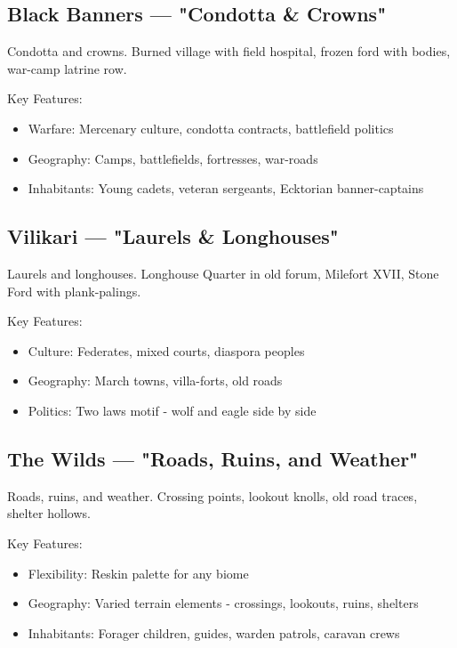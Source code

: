 \subsection{Black Banners — "Condotta \& Crowns"}
\label{sec:blackbanners}

Condotta and crowns. Burned village with field hospital, frozen ford with bodies, war-camp latrine row.

Key Features:
\begin{itemize}
    \item Warfare: Mercenary culture, condotta contracts, battlefield politics
    \item Geography: Camps, battlefields, fortresses, war-roads
    \item Inhabitants: Young cadets, veteran sergeants, Ecktorian banner-captains
\end{itemize}

\subsection{Vilikari — "Laurels \& Longhouses"}
\label{sec:vilikari}

Laurels and longhouses. Longhouse Quarter in old forum, Milefort XVII, Stone Ford with plank-palings.

Key Features:
\begin{itemize}
    \item Culture: Federates, mixed courts, diaspora peoples
    \item Geography: March towns, villa-forts, old roads
    \item Politics: Two laws motif - wolf and eagle side by side
\end{itemize}

\subsection{The Wilds — "Roads, Ruins, and Weather"}
\label{sec:wilds}

Roads, ruins, and weather. Crossing points, lookout knolls, old road traces, shelter hollows.

Key Features:
\begin{itemize}
    \item Flexibility: Reskin palette for any biome
    \item Geography: Varied terrain elements - crossings, lookouts, ruins, shelters
    \item Inhabitants: Forager children, guides, warden patrols, caravan crews
\end{itemize}


